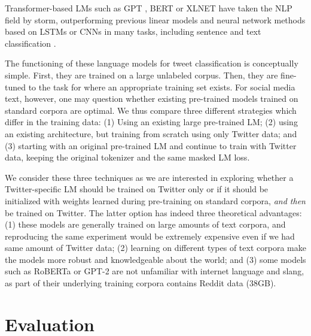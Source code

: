 \documentclass[11pt,a4paper]{article}
\begin{document}
Transformer-based LMs such as GPT \cite{radford2018improving}, BERT \cite{devlin-etal-2019-bert} or XLNET \cite{yang2019xlnet} have taken the NLP field by storm, outperforming previous linear models and neural network methods based on LSTMs or CNNs in many tasks, including sentence and text classification \cite{wang2019glue}. 


The functioning of these language models for tweet classification is conceptually simple. First, they are trained on a large unlabeled corpus. Then, they are fine-tuned to the task for where an appropriate training set exists. For social media text, however, one may question whether existing pre-trained models trained on standard corpora are optimal. We thus compare three different strategies which differ in the training data:
(1) Using an existing large pre-trained LM;
(2) using an existing architecture, but training from scratch using only Twitter data; and
(3) starting with an original pre-trained LM and continue to train with Twitter data, keeping the original tokenizer and the same masked LM loss. 
 




We consider these three techniques as we are interested in exploring whether a Twitter-specific LM should be trained on Twitter only 
or if it should be initialized with weights learned during pre-training on standard corpora, \textit{and then} be trained on Twitter.
The latter option has indeed three theoretical advantages: (1) these models are generally trained on large amounts of text corpora, and reproducing the same experiment would be extremely expensive even if we had same amount of Twitter data; (2) learning on different types of text corpora make the models more robust and knowledgeable about the world; and (3) some models such as RoBERTa \cite{liu2019roberta} or GPT-2 \cite{radford2019language} are not unfamiliar with internet language and slang, as part of their underlying training corpora contains Reddit data (38GB).





\section{Evaluation}
\end{document}
